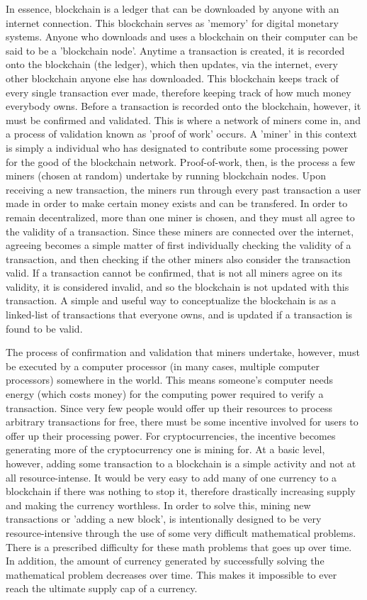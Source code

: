 \documentclass[]{article}
\begin{document}
In essence, blockchain is a ledger that can be downloaded by anyone with an internet connection. This blockchain serves as 'memory' for digital monetary systems. Anyone who downloads and uses a blockchain on their computer can be said to be a 'blockchain node'. Anytime a transaction is created, it is recorded onto the blockchain (the ledger), which then updates, via the internet, every other blockchain anyone else has downloaded. This blockchain keeps track of every single transaction ever made, therefore keeping track of how much money everybody owns.  Before a transaction is recorded onto the blockchain, however, it must be confirmed and validated. This is where a network of miners come in, and a process of validation known as 'proof of work' occurs. A 'miner' in this context is simply a individual who has designated to contribute some processing power for the good of the blockchain network. Proof-of-work, then, is the process a few miners (chosen at random) undertake by running blockchain nodes. Upon receiving a new transaction, the miners run through every past transaction a user made in order to make certain money exists and can be transfered. In order to remain decentralized, more than one miner is chosen, and they must all agree to the validity of a transaction. Since these miners are connected over the internet, agreeing becomes a simple matter of first individually checking the validity of a transaction, and then checking if the other miners also consider the transaction valid. If a transaction cannot be confirmed, that is not all miners agree on its validity, it is considered invalid, and so the blockchain is not updated with this transaction. A simple and useful way to conceptualize the blockchain is as a linked-list of transactions that everyone owns, and is updated if a transaction is found to be valid.
 
The process of confirmation and validation that miners undertake, however, must be executed by a computer processor (in many cases, multiple computer processors) somewhere in the world. This means someone's computer needs energy (which costs money) for the computing power required to verify a transaction. Since very few people would offer up their resources to process arbitrary transactions for free, there must be some incentive involved for users to offer up their processing power. For cryptocurrencies, the incentive becomes generating more of the cryptocurrency one is mining for. At a basic level, however, adding some transaction to a blockchain is a simple activity and not at all resource-intense. It would be very easy to add many of one currency to a blockchain if there was nothing to stop it, therefore drastically increasing supply and making the currency worthless. In order to solve this, mining new transactions or 'adding a new block', is intentionally designed to be very resource-intensive through the use of some very difficult mathematical problems. There is a prescribed difficulty for these math problems that goes up over time. In addition, the amount of currency generated by successfully solving the mathematical problem decreases over time. This makes it impossible to ever reach the ultimate supply cap of a currency. 
\end{document}
